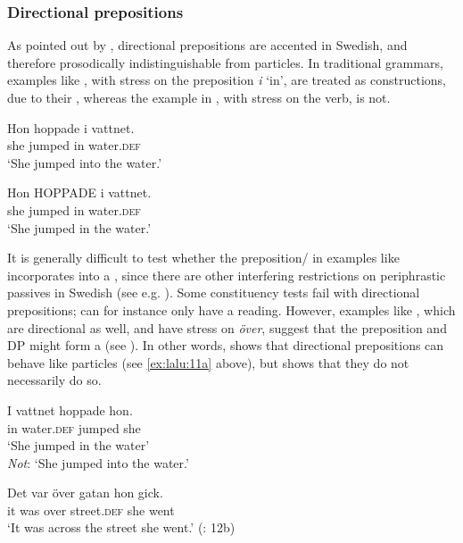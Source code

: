 \documentclass[output=paper]{langscibook}
\begin{document}
\subsubsection{Directional prepositions} 

As pointed out by \citet{Svenonius2003}, directional prepositions are accented in Swedish, and therefore prosodically indistinguishable from particles. In traditional grammars, examples like , with stress on the preposition \textit{i} ‘in’, are treated as  constructions, due to their , whereas the  example in , with stress on the verb, is not.


\ea\label{ex:lalu:15}
\ea\label{ex:lalu:15a}
\gll  Hon   hoppade    i   vattnet. \\
    she     jumped     in   water\textsc{.def}\\
\glt `She jumped into the water.'

\ex\label{ex:lalu:15b}
\gll  Hon   HOPPADE   i   vattnet. \\
    she     jumped       in   water\textsc{.def}\\
\glt `She jumped in the water.'
\z
\z


It is generally difficult to test whether the preposition/ in examples like  incorporates into a , since there are other interfering restrictions on periphrastic passives in Swedish (see e.g. \citealt{Engdahl2006}). Some constituency tests fail with directional prepositions;  can for instance only have a  reading. However, examples like , which are directional as well, and have stress on \textit{över}, suggest that the preposition and DP might form a  (see \citealt{Tungseth2006}). In other words,  shows that directional prepositions can behave like particles (see \ref{ex:lalu:11a} above), but  shows that they do not necessarily do so.


\ea\label{ex:lalu:16}
\ea\label{ex:lalu:16a}
\gll  I     vattnet   hoppade   hon. \\
    in     water\textsc{.def}  jumped   she\\
\glt `She jumped in the water\textsc{’}\\
    \emph{Not}: ‘She jumped into the water.'

\ex\label{ex:lalu:16b}
\gll  Det  var   över   gatan     hon   gick.\\
    it     was  over   street\textsc{.def}   she   went\\
\glt `It was across the street she went.'     (\citealt{Svenonius2003}: 12b)\\
\z
\z
\end{document}

